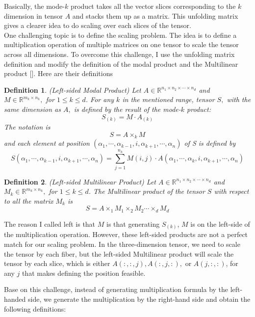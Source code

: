 \documentclass{article}
\newtheorem{definition}{Definition}[section]
\begin{document}
Basically, the mode-$k$ product takes all the vector slices corresponding to the $k$ dimension in tensor $A$ and stacks them up as a matrix. This unfolding matrix gives a clearer idea to do scaling over each slices of the tensor.
\\ 
One challenging topic is to define the scaling problem. The idea is to define a multiplication operation of multiple matrices on one tensor to scale the tensor across all dimensions. To overcome this challenge, I use the unfolding matrix definition and modify the definition of the modal product and the Multilinear product []. Here are their definitions


\begin{definition}{(Left-sided Modal Product)}
Let $A \in \mathbb{R}^{n_1 \times n_2 \times \cdots \times n_d}$ and $M\in \mathbb{R}^{m_k \times n_k},$ for $1\leq k \leq d$. For any $k$ in the mentioned range, tensor $S,$ with the same dimension as $A,$ is defined by the result of the mode-$k$ product:
$$S_{(k)} = M\cdot A_{(k)}$$
The notation is
$$S = A\times_{k} M$$
and each element at position $(\alpha_1, \cdots, \alpha_{k-1}, i, \alpha_{k+1}, \cdots, \alpha_n)$ of S is defined by
\begin{equation}
    S(\alpha_1, \cdots, \alpha_{k-1}, i, \alpha_{k+1}, \cdots, \alpha_n) = \sum_{j=1}^{n_k} M(i,j) \cdot A(\alpha_1, \cdots, \alpha_k, i, \alpha_{k+1}, \cdots, \alpha_n)
\end{equation}{}
\end{definition}{}

\begin{definition}{(Left-sided Multilinear Product)}
Let $A \in \mathbb{R}^{n_1 \times n_2 \times \cdots \times n_d}$ and $M_k \in \mathbb{R}^{m_k \times n_k},$ for $1\leq k \leq d$. The Multilinear product of the tensor $S$ with respect to all the matrix $M_k$ is 
$$S = A \times_{1} M_1 \times_{2} M_2 \cdots \times_{d} M_d$$
\end{definition}{}

The reason I called left is that $M$ is that generating $S_{(k)}$, $M$ is on the left-side of the multiplication operation. However, these left-sided products are not a perfect match for our scaling problem. In the three-dimension tensor, we need to scale the tensor by each fiber, but the left-sided Multilinear product will scale the tensor by each slice, which is either $A(:,:,j), A(:,j,:),$ or $A(j,:,:)$, for any $j$ that makes defining the position feasible.

Base on this challenge, instead of generating multiplication formula by the left-handed side, we generate the multiplication by the right-hand side and obtain the following definitions:
\end{document}
